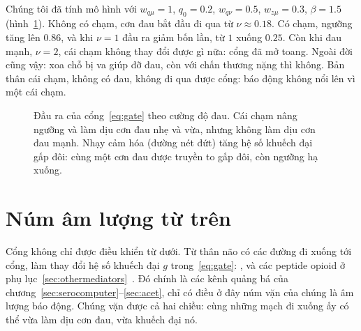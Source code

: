 Chúng tôi đã tính mô hình với $w_{q\mu}=1$, $q_0=0.2$, $w_{q\nu}=0.5$, $w_{z\mu}=0.3$, $\beta=1.5$ (hình~\ref{fig:gatecurves}). Không có chạm, cơn đau bắt đầu đi qua từ $\nu\approx0.18$. Có chạm, ngưỡng tăng lên $0.86$, và khi $\nu=1$ đầu ra giảm bốn lần, từ $1$ xuống $0.25$. Còn khi đau mạnh, $\nu=2$, cái chạm không thay đổi được gì nữa: cổng đã mở toang. Ngoài đời cũng vậy: xoa chỗ bị va giúp đỡ đau, còn với chấn thương nặng thì không. Bản thân cái chạm, không có đau, không đi qua được cổng: báo động không nổi lên vì một cái chạm.

\begin{figure}[t]
\centering
{}
\caption{Đầu ra của cổng~\eqref{eq:gate} theo cường độ đau. Cái chạm nâng ngưỡng và làm dịu cơn đau nhẹ và vừa, nhưng không làm dịu cơn đau mạnh. Nhạy cảm hóa (đường nét đứt) tăng hệ số khuếch đại gấp đôi: cùng một cơn đau được truyền to gấp đôi, còn ngưỡng hạ xuống.}
\label{fig:gatecurves}
\end{figure}

\section{Núm âm lượng từ trên}

Cổng không chỉ được điều khiển từ dưới. Từ thân não có các đường đi xuống tới cổng, làm thay đổi hệ số khuếch đại $g$ trong~\eqref{eq:gate}: ,  và các peptide opioid ở phụ lục~\ref{sec:othermediators}~\cite{Fields2004}. Đó chính là các kênh quảng bá của chương~\ref{sec:serocomputer}--\ref{sec:acet}, chỉ có điều ở đây núm vặn của chúng là âm lượng báo động. Chúng vặn được cả hai chiều: cùng những mạch đi xuống ấy có thể vừa làm dịu cơn đau, vừa khuếch đại nó.

